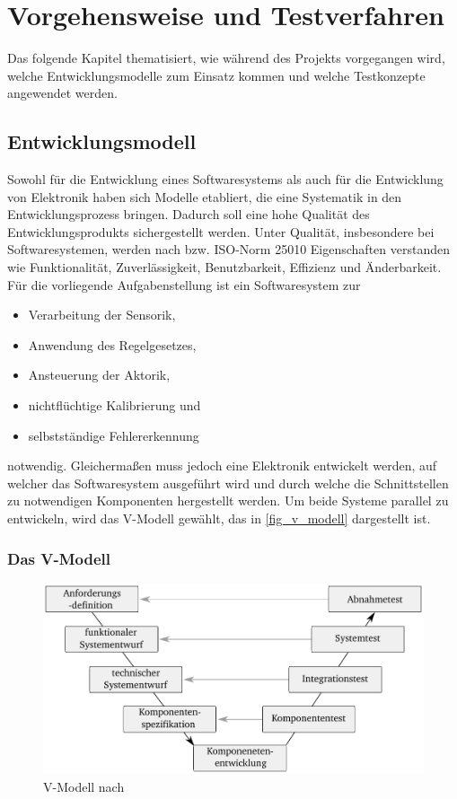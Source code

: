 \chapter{Vorgehensweise und Testverfahren}\label{kap3}
Das folgende Kapitel thematisiert, wie während des Projekts vorgegangen wird, welche Entwicklungsmodelle zum Einsatz kommen und welche Testkonzepte angewendet werden.

\section{Entwicklungsmodell}
Sowohl für die Entwicklung eines Softwaresystems als auch für die Entwicklung von Elektronik haben sich Modelle etabliert, die eine Systematik in den Entwicklungsprozess bringen. Dadurch soll eine hohe Qualität des Entwicklungsprodukts sichergestellt werden. 
Unter Qualität, insbesondere bei Softwaresystemen, werden nach \cite{BasSof} bzw. ISO-Norm 25010 \cite{ISO_25010} Eigenschaften verstanden wie Funktionalität, Zuverlässigkeit, Benutzbarkeit, Effizienz und Änderbarkeit.\\
Für die vorliegende Aufgabenstellung ist ein Softwaresystem zur
\begin{itemize}
	\item Verarbeitung der Sensorik,
	\item Anwendung des Regelgesetzes,
	\item Ansteuerung der Aktorik,
	\item nichtflüchtige Kalibrierung und
	\item selbstständige Fehlererkennung
\end{itemize}
notwendig. Gleichermaßen muss jedoch eine Elektronik entwickelt werden, auf welcher das Softwaresystem ausgeführt wird und durch welche die Schnittstellen zu notwendigen Komponenten hergestellt werden. Um beide Systeme parallel zu entwickeln, wird das V-Modell gewählt, das in \autoref{fig_v_modell} dargestellt ist. 



\subsection{Das V-Modell}

\begin{figure}[H]%
\includegraphics[width=\columnwidth]{./Bilder/fig_v_modell}%
\caption{V-Modell nach \cite{Boehm79}}%
\label{fig_v_modell}%
\end{figure}

